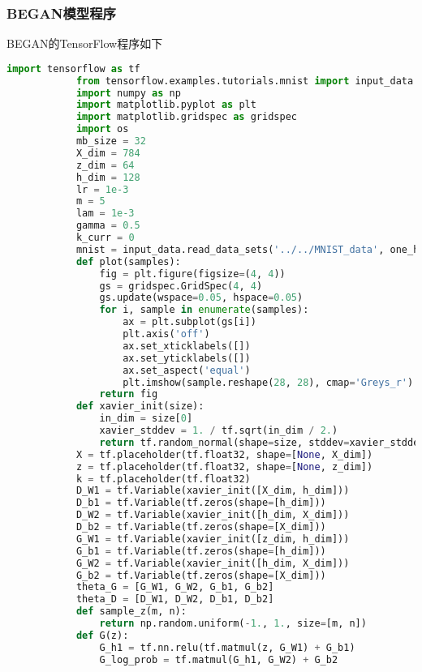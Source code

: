         \subsubsection{BEGAN模型程序}
            \par
            BEGAN的TensorFlow程序如下
            \begin{lstlisting}[language = Python]
            import tensorflow as tf
            from tensorflow.examples.tutorials.mnist import input_data
            import numpy as np
            import matplotlib.pyplot as plt
            import matplotlib.gridspec as gridspec
            import os
            mb_size = 32
            X_dim = 784
            z_dim = 64
            h_dim = 128
            lr = 1e-3
            m = 5
            lam = 1e-3
            gamma = 0.5
            k_curr = 0
            mnist = input_data.read_data_sets('../../MNIST_data', one_hot=True)
            def plot(samples):
                fig = plt.figure(figsize=(4, 4))
                gs = gridspec.GridSpec(4, 4)
                gs.update(wspace=0.05, hspace=0.05)
                for i, sample in enumerate(samples):
                    ax = plt.subplot(gs[i])
                    plt.axis('off')
                    ax.set_xticklabels([])
                    ax.set_yticklabels([])
                    ax.set_aspect('equal')
                    plt.imshow(sample.reshape(28, 28), cmap='Greys_r')
                return fig
            def xavier_init(size):
                in_dim = size[0]
                xavier_stddev = 1. / tf.sqrt(in_dim / 2.)
                return tf.random_normal(shape=size, stddev=xavier_stddev)
            X = tf.placeholder(tf.float32, shape=[None, X_dim])
            z = tf.placeholder(tf.float32, shape=[None, z_dim])
            k = tf.placeholder(tf.float32)
            D_W1 = tf.Variable(xavier_init([X_dim, h_dim]))
            D_b1 = tf.Variable(tf.zeros(shape=[h_dim]))
            D_W2 = tf.Variable(xavier_init([h_dim, X_dim]))
            D_b2 = tf.Variable(tf.zeros(shape=[X_dim]))
            G_W1 = tf.Variable(xavier_init([z_dim, h_dim]))
            G_b1 = tf.Variable(tf.zeros(shape=[h_dim]))
            G_W2 = tf.Variable(xavier_init([h_dim, X_dim]))
            G_b2 = tf.Variable(tf.zeros(shape=[X_dim]))
            theta_G = [G_W1, G_W2, G_b1, G_b2]
            theta_D = [D_W1, D_W2, D_b1, D_b2]
            def sample_z(m, n):
                return np.random.uniform(-1., 1., size=[m, n])
            def G(z):
                G_h1 = tf.nn.relu(tf.matmul(z, G_W1) + G_b1)
                G_log_prob = tf.matmul(G_h1, G_W2) + G_b2

\end{lstlisting}
